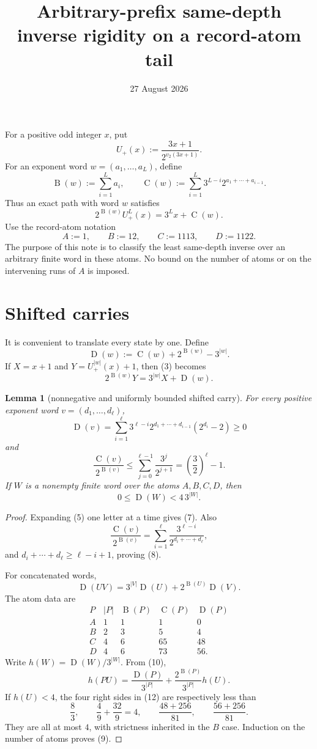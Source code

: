 \documentclass[11pt]{article}
\title{Arbitrary-prefix same-depth inverse rigidity on a record-atom tail}
\author{}
\date{27 August 2026}
\newtheorem{lemma}[theorem]{Lemma}
\newcommand{\Up}{U_+}
\newcommand{\mass}{\operatorname{B}}
\newcommand{\car}{\operatorname{C}}
\newcommand{\sh}{\operatorname{D}}
\begin{document}
\maketitle

For a positive odd integer $x$, put
\[
 \Up(x):=\frac{3x+1}{2^{v_2(3x+1)}}.
 \tag{1}
\]
For an exponent word $w=(a_1,\ldots,a_L)$, define
\[
 \mass(w):=\sum_{i=1}^L a_i,
 \qquad
 \car(w):=\sum_{i=1}^L3^{L-i}2^{a_1+\cdots+a_{i-1}}.
 \tag{2}
\]
Thus an exact path with word $w$ satisfies
\[
 2^{\mass(w)}\Up^L(x)=3^Lx+\car(w).
 \tag{3}
\]
Use the record-atom notation
\[
 A:=1,\qquad B:=12,\qquad C:=1113,\qquad D:=1122.
 \tag{4}
\]
The purpose of this note is to classify the least same-depth inverse over
an arbitrary finite word in these atoms.  No bound on the number of atoms
or on the intervening runs of $A$ is imposed.

\section{Shifted carries}

It is convenient to translate every state by one.  Define
\[
 \sh(w):=\car(w)+2^{\mass(w)}-3^{|w|}.
 \tag{5}
\]
If $X=x+1$ and $Y=\Up^{|w|}(x)+1$, then (3) becomes
\[
 2^{\mass(w)}Y=3^{|w|}X+\sh(w).
 \tag{6}
\]

\begin{lemma}[nonnegative and uniformly bounded shifted carry]
For every positive exponent word $v=(d_1,\ldots,d_\ell)$,
\[
 \sh(v)=\sum_{i=1}^{\ell}
 3^{\ell-i}2^{d_1+\cdots+d_{i-1}}(2^{d_i}-2)\geq0
 \tag{7}
\]
and
\[
 \frac{\car(v)}{2^{\mass(v)}}
 \leq\sum_{j=0}^{\ell-1}\frac{3^j}{2^{j+1}}
 =\left(\frac32\right)^\ell-1.
 \tag{8}
\]
If $W$ is a nonempty finite word over the atoms $A,B,C,D$, then
\[
 \boxed{0\leq\sh(W)<4\,3^{|W|}.}
 \tag{9}
\]
\end{lemma}

\begin{proof}
Expanding (5) one letter at a time gives (7).  Also
\[
 \frac{\car(v)}{2^{\mass(v)}}
 =\sum_{i=1}^{\ell}
 \frac{3^{\ell-i}}{2^{d_i+\cdots+d_\ell}},
\]
and $d_i+\cdots+d_\ell\geq\ell-i+1$, proving (8).

For concatenated words,
\[
 \sh(UV)=3^{|V|}\sh(U)+2^{\mass(U)}\sh(V).
 \tag{10}
\]
The atom data are
\[
\begin{array}{c|c|c|c|c}
P&|P|&\mass(P)&\car(P)&\sh(P)\\ \hline
A&1&1&1&0\\
B&2&3&5&4\\
C&4&6&65&48\\
D&4&6&73&56.
\end{array}
\tag{11}
\]
Write $h(W)=\sh(W)/3^{|W|}$.  From (10),
\[
 h(PU)=\frac{\sh(P)}{3^{|P|}}
       +\frac{2^{\mass(P)}}{3^{|P|}}h(U).
 \tag{12}
\]
If $h(U)<4$, the four right sides in (12) are respectively less than
\[
 \frac83,\qquad
 \frac4{9}+\frac{32}{9}=4,\qquad
 \frac{48+256}{81},\qquad
 \frac{56+256}{81}.
\]
They are all at most $4$, with strictness inherited in the $B$ case.
Induction on the number of atoms proves (9).
\end{proof}
\end{document}

